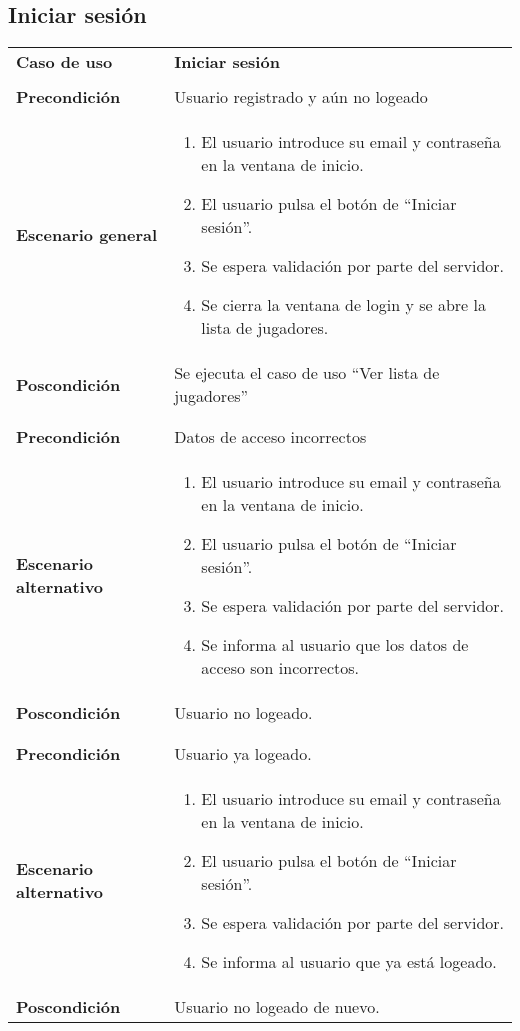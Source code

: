 \subsection{Iniciar sesión}

{\footnotesize
\begin{tabularx}{0.95\textwidth}{p{}|X}

\textbf{Caso de uso} & \textbf{Iniciar sesión} \\
& \\
\textbf{Precondición} & Usuario registrado y aún no logeado \\

\textbf{Escenario general} & \begin{enumerate}
\item El usuario introduce su email y contraseña en la ventana de inicio.
\item El usuario pulsa el botón de ``Iniciar sesión''.
\item Se espera validación por parte del servidor.
\item Se cierra la ventana de login y se abre la lista de jugadores.
\end{enumerate} \\

\textbf{Poscondición} & Se ejecuta el caso de uso ``Ver lista de jugadores''
\\
& \\
& \\
\textbf{Precondición} & Datos de acceso incorrectos\\
\textbf{Escenario alternativo} & \begin{enumerate}
\item El usuario introduce su email y contraseña en la ventana de inicio.
\item El usuario pulsa el botón de ``Iniciar sesión''.
\item Se espera validación por parte del servidor.
\item Se informa al usuario que los datos de acceso son incorrectos.
\end{enumerate}\\
\textbf{Poscondición} &Usuario no logeado.\\
& \\
& \\
\textbf{Precondición} & Usuario ya logeado.\\
\textbf{Escenario alternativo}& \begin {enumerate}
\item El usuario introduce su email y contraseña en la ventana de inicio.
\item El usuario pulsa el botón de ``Iniciar sesión''.
\item Se espera validación por parte del servidor.
\item Se informa al usuario que ya está logeado.
\end{enumerate}\\
\textbf{Poscondición}& Usuario no logeado de nuevo.\\
\end{tabularx}
}

